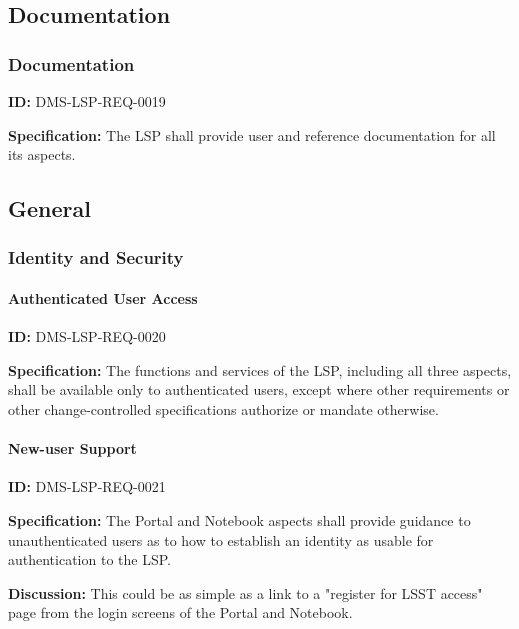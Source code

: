 \documentclass[SE,toc,lsstdraft]{lsstdoc}
\begin{document}
\subsection{Documentation}

\subsubsection{Documentation}

\label{DMS-LSP-REQ-0019}
\textbf{ID:} DMS-LSP-REQ-0019

\textbf{Specification:}
The LSP shall provide user and reference documentation for all its aspects.

\subsection{General}

\subsubsection{Identity and Security}

\paragraph{Authenticated User Access}\hfill  %

\label{DMS-LSP-REQ-0020}
\textbf{ID:} DMS-LSP-REQ-0020

\textbf{Specification:}
The functions and services of the LSP, including all three aspects, shall be available only to authenticated users, except where other requirements or other change-controlled specifications authorize or mandate otherwise.

\paragraph{New-user Support}\hfill  %

\label{DMS-LSP-REQ-0021}
\textbf{ID:} DMS-LSP-REQ-0021

\textbf{Specification:}
The Portal and Notebook aspects shall provide guidance to unauthenticated users as to how to establish an identity as usable for authentication to the LSP.

\textbf{Discussion:}
This could be as simple as a link to a "register for LSST access" page from the login screens of the Portal and Notebook.
\end{document}
